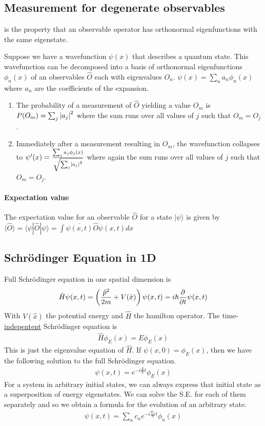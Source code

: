 \subsection{Measurement for degenerate observables}
 is the property that  an observable operator has orthonormal
eigenfunctions with the same eigenstate.

Suppose we have a wavefunction $\psi(x)$ that describes a quantum state. This
wavefunction can be decomposed into a basis of orthonormal eigenfunctions $\phi_n(x)$
of an observables $\hat{O}$ each with eigenvalues $O_n$.
$\psi(x) = \sum_n a_n \phi_n (x)$ where $a_n$ are the coefficients of the expansion.
\begin{enumerate}
    \item The probability of a measurement of $\hat{O}$ yielding a value $O_m$ is
        $P(O_m) = \sum_j \left\vert a_j \right\vert^2$ where the sum runs over all values of $j$
        such that $O_m = O_j$.    
    \item Immediately after a measurement resulting in $O_m$, the wavefunction
        collapses to $\psi'(x) = \frac{\sum_j a_j \phi_j (x)}{\sqrt{\sum_j \left\vert a_j \right\vert^2}}$
        where again the sum runs over all values of $j$ such that $O_m = O_j$.
\end{enumerate}

\paragraph{Expectation value}
The expectation value for an observable $\hat{O}$ for a state $| \psi \rangle$
is given by
$\langle \hat{O} \rangle = \langle \psi | \hat{O} | \psi \rangle
= \int \overline{\psi(x,t)} \hat{O} \psi(x,t) dx$


\subsection{Schrödinger Equation in 1D}
Full Schrödinger equation in one spatial dimension is
\begin{align*}
    \hat{H} \psi(x,t)
    = \left( \frac{\hat{p}^2}{2m} + V (\hat{x}) \right) \psi(x,t)
    = i \hbar \frac{\partial}{\partial t} \psi(x,t)
\end{align*}
With $V(\hat{x})$ the potential energy and $\hat{H}$ the hamilton operator.
The time-\underline{indepentent} Schrödinger equation is
\begin{align*}
    \hat{H} \phi_E (x) = E \phi_E (x)
\end{align*}
This is just the eigenvalue equation of $\hat{H}$. If $\psi(x,0) = \phi_E (x)$,
then we have the following solution to the full Schrödinger equation.
\begin{align*}
    \psi(x,t) = e^{-i \frac{E}{\hbar} t} \phi_E (x)
\end{align*}
For a system in arbitrary initial states, we can always express that initial state
as a superposition of energy eigenstates. We can solve the S.E. for each of them
separately and so we obtain a formula for the evolution of an arbitrary state.
\begin{align*}
    \psi(x,t) = \sum_n c_n e^{-i \frac{E_n}{\hbar} t} \phi_n(x)
\end{align*}

